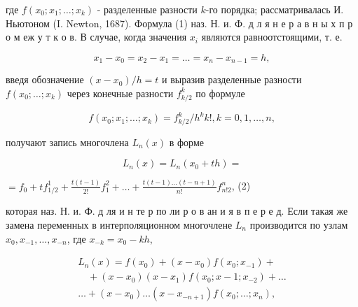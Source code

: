 \documentclass[10pt]{article}
\begin{document}
где $f\left(x_{0} ; x_{1} ; \ldots ; x_{k}\right)$ - разделенные разности $k$-го порядка; рассматривалась И. Ньютоном (I. Newton, 1687). Формула (1) наз. Н. и. Ф. д л я н е р а в н ы х п р о м еж у т к о в. В случае, когда значения $x_{i}$ являются равноотстоящими, т. е.



\[

x_{1}-x_{0}=x_{2}-x_{1}=\ldots=x_{n}-x_{n-1}=h,

\]



введя обозначение $\left(x-x_{0}\right) / h=t$ и выразив разделенные разности $f\left(x_{0} ; \ldots ; x_{k}\right)$ через конечные разности $f_{k / 2}^{k}$ по формуле



\[

f\left(x_{0} ; x_{1} ; \ldots ; x_{k}\right)=f_{k / 2}^{k} / h^{k} k !, k=0,1, \ldots, n,

\]



получают запись многочлена $L_{n}(x)$ в форме



\[

L_{n}(x)=L_{n}\left(x_{0}+t h\right)=

\]



$=f_{0}+t f_{1 / 2}^{1}+\frac{t(t-1)}{2 !} f_{1}^{2}+\ldots+\frac{t(t-1) \ldots(t-n+1)}{n !} f_{n ! 2}^{n}$, (2)



которая наз. Н. и. Ф. д ля и н те р по ли р о в ан и я в п е р е д. Если такая же замена переменных в интерполяционном многочлене $L_{n}$ производится по узлам $x_{0}, x_{-1}, \ldots, x_{-n}$, где $x_{-k}=x_{0}-k h$,



\[

\begin{gathered}

L_{n}(x)=f\left(x_{0}\right)+\left(x-x_{0}\right) f\left(x_{0} ; x_{-1}\right)+ \\

\quad+\left(x-x_{0}\right)\left(x-x_{1}\right) f\left(x_{0} ; x-1 ; x_{-2}\right)+\ldots \\

\ldots+\left(x-x_{0}\right) \ldots\left(x-x_{-n+1}\right) f\left(x_{0} ; \ldots ; x_{n}\right),

\end{gathered}

\]
\end{document}
